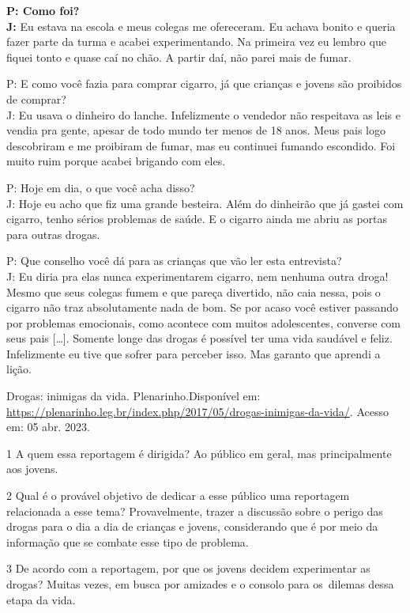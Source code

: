 \begin{itemize}
\begin{itemize}
\textbf{P: Como foi?\\
J:} Eu estava na escola e meus colegas me ofereceram. Eu achava bonito e
queria fazer parte da turma e acabei experimentando. Na primeira vez eu
lembro que fiquei tonto e quase caí no chão. A partir daí, não parei
mais de fumar.

P: E como você fazia para comprar cigarro, já que crianças e jovens são
proibidos de comprar?\\
J: Eu usava o dinheiro do lanche. Infelizmente o vendedor não respeitava
as leis e vendia pra gente, apesar de todo mundo ter menos de 18 anos.
Meus pais logo descobriram e me proibiram de fumar, mas eu continuei
fumando escondido. Foi muito ruim porque acabei brigando com eles.

P: Hoje em dia, o que você acha disso?\\
J: Hoje eu acho que fiz uma grande besteira. Além do dinheirão que já
gastei com cigarro, tenho sérios problemas de saúde. E o cigarro ainda
me abriu as portas para outras drogas.

P: Que conselho você dá para as crianças que vão ler esta entrevista?\\
J: Eu diria pra elas nunca experimentarem cigarro, nem nenhuma outra
droga! Mesmo que seus colegas fumem e que pareça divertido, não caia
nessa, pois o cigarro não traz absolutamente nada de bom. Se por acaso
você estiver passando por problemas emocionais, como acontece com muitos
adolescentes, converse com seus pais {[}\ldots{}{]}. Somente longe das
drogas é possível ter uma vida saudável e feliz. Infelizmente eu tive
que sofrer para perceber isso. Mas garanto que aprendi a lição.

Drogas: inimigas da vida. Plenarinho.Disponível em:
\url{https://plenarinho.leg.br/index.php/2017/05/drogas-inimigas-da-vida/}.
Acesso em: 05 abr. 2023.

\num{1} A quem essa reportagem é dirigida?  Ao público em
geral, mas principalmente aos jovens.

\num{2} Qual é o provável objetivo de dedicar a esse público uma
reportagem relacionada a esse tema?  Provavelmente, trazer a
discussão sobre o perigo das drogas para o dia a dia de crianças e
jovens, considerando que é por meio da informação que se combate esse
tipo de problema.

\num{3} De acordo com a reportagem, por que os jovens decidem
experimentar as drogas?  Muitas vezes, em busca por amizades e
o consolo para os~dilemas dessa etapa da vida.


\end{itemize}
\end{itemize}
